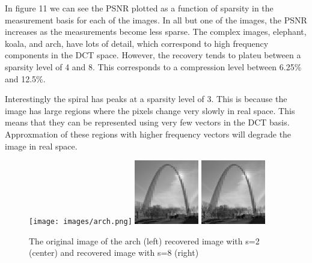 \documentclass{article}
\begin{document}
In figure 11 we can see the PSNR plotted as a function of sparsity in the measurement basis for each of the images.
In all but one of the images, the PSNR increases as the measurements become less sparse.
The complex images, elephant, koala, and arch, have lots of detail, which correspond to high frequency components in the DCT space.
However, the recovery tends to plateu between a sparsity level of 4 and 8.
This corresponds to a compression level between 6.25\% and 12.5\%.


Interestingly the spiral has peaks at a sparsity level of 3.
This is because the image has large regions where the pixels change very slowly in real space.
This means that they can be represented using very few vectors in the DCT basis.
Approxmation of these regions with higher frequency vectors will degrade the image in real space.

\begin{figure}[H]
    \captionsetup{width=.75\linewidth}
    \centering
        \texttt{[image: images/arch.png]}
        \includegraphics[width=0.25\textwidth]{images/arch-recovered_02.png}
        \includegraphics[width=0.25\textwidth]{images/arch-recovered_08.png}
        \caption{The original image of the arch (left) recovered image with s=2 (center) and recovered image with s=8 (right)}
\end{figure}
\end{document}
